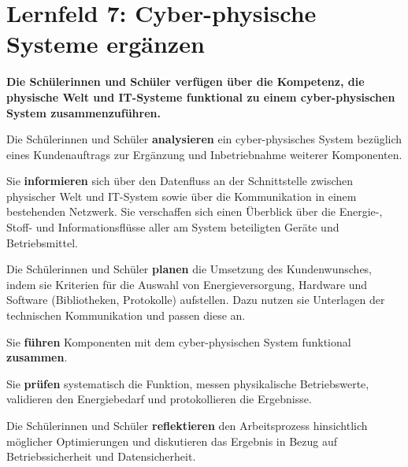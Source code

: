 \chapter{Lernfeld 7: Cyber-physische Systeme ergänzen}

\textbf{Die Schülerinnen und Schüler verfügen über die Kompetenz, die physische Welt und
IT-Systeme funktional zu einem cyber-physischen System zusammenzuführen.}

Die Schülerinnen und Schüler \textbf{analysieren} ein cyber-physisches System bezüglich eines
Kundenauftrags zur Ergänzung und Inbetriebnahme weiterer Komponenten.

Sie \textbf{informieren} sich über den Datenfluss an der Schnittstelle zwischen physischer Welt
und IT-System sowie über die Kommunikation in einem bestehenden Netzwerk. Sie verschaffen sich einen Überblick über die Energie-, Stoff- und Informationsflüsse aller am System beteiligten Geräte und Betriebsmittel.

Die Schülerinnen und Schüler \textbf{planen} die Umsetzung des Kundenwunsches, indem sie Kriterien für die Auswahl von Energieversorgung, Hardware und Software (Bibliotheken, Protokolle) aufstellen. Dazu nutzen sie Unterlagen der technischen Kommunikation und passen
diese an.

Sie \textbf{führen} Komponenten mit dem cyber-physischen System funktional \textbf{zusammen}.

Sie \textbf{prüfen} systematisch die Funktion, messen physikalische Betriebswerte, validieren den
Energiebedarf und protokollieren die Ergebnisse.

Die Schülerinnen und Schüler \textbf{reflektieren} den Arbeitsprozess hinsichtlich möglicher Optimierungen und diskutieren das Ergebnis in Bezug auf Betriebssicherheit und Datensicherheit.